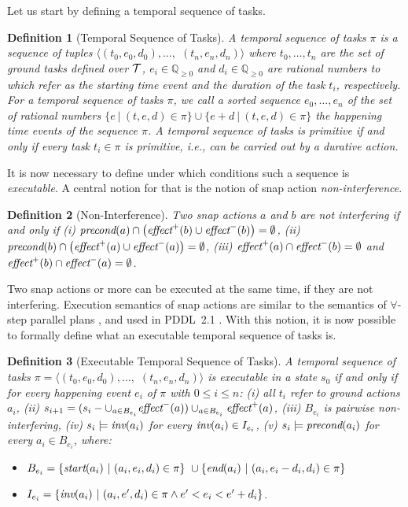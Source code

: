 \documentclass[letterpaper]{article} %
\newtheorem{definition}{Definition}
\newcommand{\pre}{\text{\it precond}}
\newcommand{\add}{\text{\it effect}^{+}}
\newcommand{\del}{\text{\it effect}^{-}}
\newcommand{\tstart}{\text{\it start}}
\newcommand{\tend}{\text{\it end}}
\newcommand{\tinv}{\text{\it inv}}
\begin{document}
Let us start by defining a temporal sequence of tasks.
\begin{definition}[Temporal Sequence of Tasks]
A {\it temporal sequence of tasks} $\pi$ is a sequence of tuples $\langle (t_0, e_0, d_0), \ldots,$ $(t_n, e_n, d_n) \rangle$ where $t_0, \ldots, t_n$ are the set of ground tasks defined over $\cal{T}$, $e_i \in \mathbb{Q}_{\geq 0}$ and $d_i \in \mathbb{Q}_{\geq 0}$ are rational numbers to which refer as the starting time event and the duration of the task $t_i$, respectively. For a temporal sequence of tasks $\pi$, we call a sorted sequence $e_0, \ldots, e_n$ of the set of rational numbers $\{e \ | \ (t, e, d) \in \pi\} \cup \{e + d \ | \ (t, e, d) \in \pi\}$ the happening time events of the sequence $\pi$. %
A temporal sequence of tasks is primitive if and only if every task $t_i \in \pi$ is primitive, i.e., can be carried out by a durative action.
\end{definition}

It is now necessary to define under which conditions such a sequence is {\it executable}. A central notion for that is the notion of snap action {\it non-interference}.
\begin{definition}[Non-Interference]
Two snap actions $a$ and $b$ are not interfering if and only if (i) $\pre(a) \cap \bigl(\add(b) \cup \del(b)\bigr) = \emptyset$, (ii) $\pre(b) \cap \bigl(\add(a) \cup \del(a)\bigr) = \emptyset$, (iii) $\add(a) \cap \del(b) = \emptyset$ and  $\add(b) \cap \del(a) = \emptyset$.
\end{definition}
Two snap actions or more can be executed at the same time, if they are not interfering. Execution semantics of snap actions are similar to the semantics of $\forall$-step parallel plans \cite{rintanen06}, and used in PDDL~2.1 \cite{fox03}. With this notion, it is now possible to formally define what an executable temporal sequence of tasks is.

\begin{definition}[Executable Temporal Sequence of Tasks]
A temporal sequence of tasks $\pi = \langle (t_0, e_0, d_0), \ldots,$ $(t_n, e_n, d_n) \rangle$ is executable in a state $s_0$ if and only if for every happening event $e_i$ of $\pi$ with $0 \leq i \leq n$:
(i) all $t_i$ refer to ground actions $a_i$,
(ii) $s_{i+1} = (s_i - \cup_{a \in B_{e_i}} \del(a)) \cup_{a \in B_{e_i}} \add(a)$,
(iii) $B_{e_i}$ is {\em pairwise non-interfering},
(iv) $s_i \models \tinv(a_i)$ for every $\tinv(a_i) \in I_{e_i}$, (v) $s_i \models \pre(a_i)$ for every $a_i \in B_{e_i}$, where:
\begin{itemize}
 \item $B_{e_i} = \{ \tstart(a_i) \ | \ (a_i, e_i, d_i) \in \pi\} \ \cup  \{\tend(a_i) \ | \ (a_i, e_i - d_i, d_i) \in \pi\}$
 \item $I_{e_i} = \{ \tinv(a_i) \ | \ (a_i,e',d_i) \in \pi \wedge e' < e_i < e' + d_i\}$.
 \end{itemize}

 \end{definition}
\end{document}
